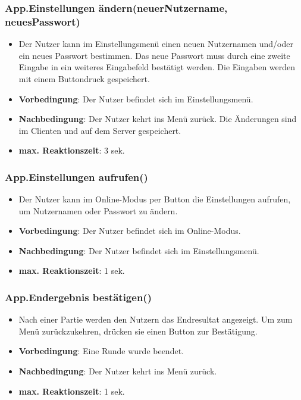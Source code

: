 \documentclass[fontsize=12pt,paper=a4,twoside]{scrartcl}
\begin{document}
\subsubsection{App.Einstellungen ändern(neuerNutzername, neuesPasswort)}
\begin{itemize}
\item Der Nutzer kann im Einstellungsmenü einen neuen Nutzernamen und/oder ein neues Passwort bestimmen. Das neue Passwort muss durch eine zweite Eingabe in ein weiteres Eingabefeld bestätigt werden. Die Eingaben werden mit einem Buttondruck gespeichert.
\item \textbf{Vorbedingung}: Der Nutzer befindet sich im Einstellungsmenü.
\item \textbf{Nachbedingung}: Der Nutzer kehrt ins Menü zurück. Die Änderungen sind im Clienten und auf dem Server gespeichert.
\item \textbf{max. Reaktionszeit}: 3 sek.
\end{itemize}

\subsubsection{App.Einstellungen aufrufen()}
\begin{itemize}
\item Der Nutzer kann im Online-Modus per Button die Einstellungen aufrufen, um Nutzernamen oder Passwort zu ändern.
\item \textbf{Vorbedingung}: Der Nutzer befindet sich im Online-Modus.
\item \textbf{Nachbedingung}: Der Nutzer befindet sich im Einstellungsmenü. 
\item \textbf{max. Reaktionszeit}: 1 sek.
\end{itemize}

\subsubsection{App.Endergebnis bestätigen()}
\begin{itemize}
\item Nach einer Partie werden den Nutzern das Endresultat angezeigt. Um zum Menü zurückzukehren, drücken sie einen Button zur Bestätigung.
\item \textbf{Vorbedingung}: Eine Runde wurde beendet.
\item \textbf{Nachbedingung}: Der Nutzer kehrt ins Menü zurück. 
\item \textbf{max. Reaktionszeit}: 1 sek.
\end{itemize}
\end{document}
